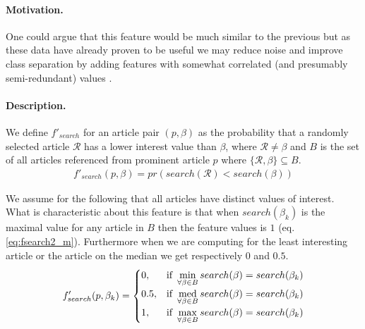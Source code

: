 \paragraph{Motivation.}
One could argue that this feature would be much similar to the previous but as these data have already proven to be useful we may reduce noise and improve class separation by adding features with somewhat correlated (and presumably semi-redundant) values \cite{guyon2003introduction}.

\paragraph{Description.}
We define $f'_{search}$ for an article pair $(p, \beta)$ as the probability that a randomly selected article $\mathcal{R}$ has a lower interest value than $\beta$, where $\mathcal{R} \neq \beta$ and $B$ is the set of all articles referenced from prominent article $p$ where $\{\mathcal{R}, \beta\} \subseteq B$. 
\begin{align}
f'_{search}(p, \beta) = pr(search(\mathcal{R}) < search(\beta))
\label{eq:search2}
\end{align}

We assume for the following that all articles have distinct values of interest. What is characteristic about this feature is that when $search(\beta_k)$ is the maximal value for any article in $B$ then the feature values is $1$ (eq. \ref{eq:fsearch2_m}). Furthermore when we are computing for the least interesting article or the article on the median we get respectively $0$ and $0.5$.
\begin{multline}
f'_{search}(p, \beta_k) = 
\begin{cases}
      0, & \text{if}\ \displaystyle \min_{\forall \beta \in B} search(\beta) = search(\beta_k) \\
      0.5, & \text{if}\ \displaystyle \operatorname*{med}_{\forall \beta \in B} search(\beta) = search(\beta_k) \\
      1, & \text{if}\ \displaystyle \max_{\forall \beta \in B} search(\beta) = search(\beta_k)
    \end{cases}
    \label{eq:fsearch2_m}
\end{multline}

